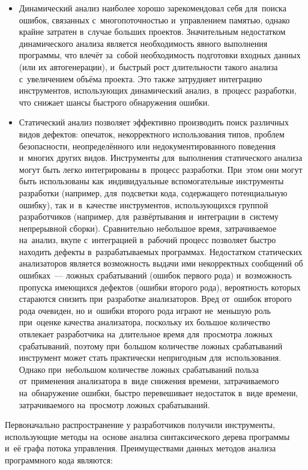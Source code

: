 \begin{itemize}
 \item Динамический анализ наиболее хорошо зарекомендовал себя для~поиска ошибок, связанных с~многопоточностью и~управлением памятью, однако крайне затратен в~случае больших проектов. Значительным недостатком динамического анализа является необходимость явного выполнения программы, что влечёт за~собой необходимость подготовки входных данных (или их автогенерации), и~быстрый рост длительности такого анализа с~увеличением объёма проекта. Это также затрудняет интеграцию инструментов, использующих динамический анализ, в~процесс разработки, что снижает шансы быстрого обнаружения ошибки.
 \item Статический анализ позволяет эффективно производить поиск различных видов дефектов: опечаток, некорректного использования типов, проблем безопасности, неопределённого или недокументированного поведения и~многих других видов. Инструменты для~выполнения статического анализа могут быть легко интегрированы в~процесс разработки. При~этом они могут быть использованы как~индивидуальные вспомогательные инструменты разработки (например, для~подсветки кода, содержащего потенциальную ошибку), так и~в~качестве инструментов, использующихся группой разработчиков (например, для~развёртывания и~интеграции в~систему непрерывной сборки). Сравнительно небольшое время, затрачиваемое на~анализ, вкупе с~интеграцией в~рабочий процесс позволяет быстро находить дефекты в~разрабатываемых программах. Недостатком статических анализаторов является возможность выдачи ими некорректных сообщений об ошибках~--- ложных срабатываний (ошибок первого рода) и~возможность пропуска имеющихся дефектов (ошибки второго рода), вероятность которых стараются снизить при~разработке анализаторов. Вред от~ошибок второго рода очевиден, но и~ошибки второго рода играют не~меньшую роль при~оценке качества анализатора, поскольку их большое количество отвлекает разработчика на~длительное время для~просмотра ложных срабатываний, поэтому при~большом количестве ложных срабатываний инструмент может стать практически непригодным для~использования. Однако при~небольшом количестве ложных срабатываний польза от~применения анализатора в~виде снижения времени, затрачиваемого на~обнаружение ошибки, быстро перевешивает недостаток в~виде времени, затрачиваемого на~просмотр ложных срабатываний.
\end{itemize}

Первоначально распространение у разработчиков получили инструменты, использующие методы на~основе анализа синтаксического дерева программы и~её графа потока управления. Преимуществами данных методов анализа программного кода являются:


